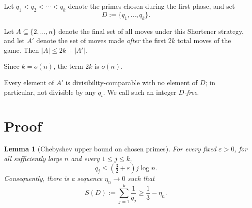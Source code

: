 \documentclass{article}
\newtheorem{lemma}{Lemma}
\begin{document}
Let $q_1 < q_2 < \cdots < q_k$ denote the primes chosen during the first phase, and set
\[
D := \{q_1, \ldots, q_k\}.
\]

Let $A \subseteq \{2, \ldots, n\}$ denote the final set of all moves under this Shortener strategy, and let $A'$ denote the set of moves made \emph{after} the first $2k$ total moves of the game. Then $|A| \le 2k + |A'|$.

Since $k = o(n)$, the term $2k$ is $o(n)$.

Every element of $A'$ is divisibility-comparable with no element of $D$; in particular, not divisible by any $q_i$. We call such an integer \emph{$D$-free}.

\section{Proof}

\begin{lemma}[Chebyshev upper bound on chosen primes]
\label{lem:prime-bound}
For every fixed $\varepsilon > 0$, for all sufficiently large $n$ and every $1 \le j \le k$,
\[
q_j \le \left(\tfrac{3}{2} + \varepsilon\right) j \log n.
\]
Consequently, there is a sequence $\eta_n \to 0$ such that
\[
S(D) := \sum_{j=1}^{k} \frac{1}{q_j} \ge \frac{1}{3} - \eta_n.
\]
\end{lemma}
\end{document}

